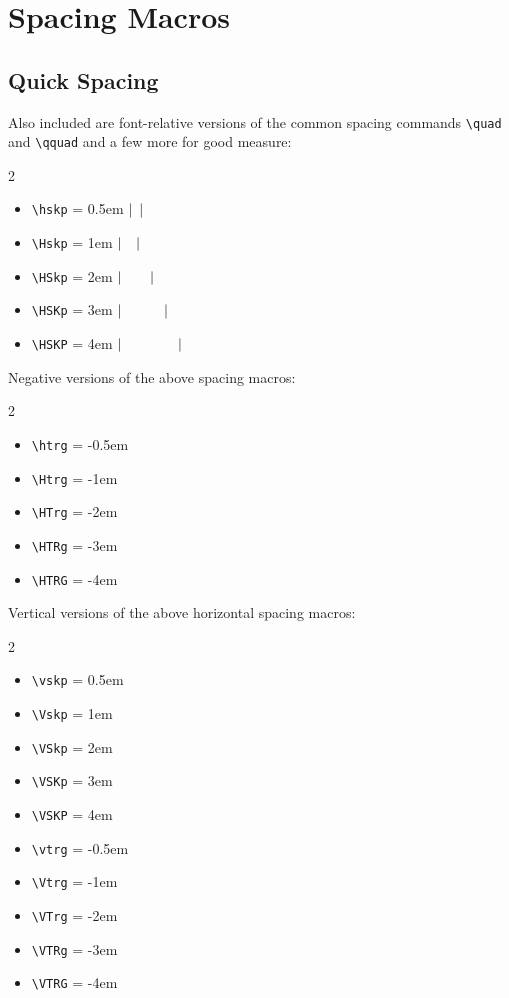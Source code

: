 \documentclass{article}
\begin{document}
\section{Spacing Macros}

\subsection*{Quick Spacing}

Also included are font-relative versions of the common spacing commands \verb|\quad| and \verb|\qquad| and a few more for good measure:
    \vtrg\begin{multicols}{2}
    \begin{itemize}
        \item\verb|\hskp|  = 0.5em \hspace{5pt}$\vert\hskip.5em\relax\vert$
        \item\verb|\Hskp|  = 1em   \hspace{13pt}$\vert\hskip1em\relax\vert$
        \item\verb|\HSkp|  = 2em   \hspace{13pt}$\vert\hskip2em\relax\vert$
        \item\verb|\HSKp|  = 3em   \hspace{5pt}$\vert\hskip3em\relax\vert$
        \item\verb|\HSKP|  = 4em   \hspace{5pt}$\vert\hskip4em\relax\vert$
    \end{itemize}
    \end{multicols}\Vtrg\vtrg
    
Negative versions of the above spacing macros:
	\vtrg\begin{multicols}{2}
	\begin{itemize}
		\item\verb|\htrg|  = -0.5em
		\item\verb|\Htrg|  = -1em
		\item\verb|\HTrg|  = -2em
		\item\verb|\HTRg|  = -3em
		\item\verb|\HTRG|  = -4em
	\end{itemize}
	\end{multicols}\Vtrg\vtrg
   
Vertical versions of the above horizontal spacing macros:
    \vtrg\begin{multicols}{2}
	\begin{itemize}
		\item\verb|\vskp| = 0.5em 
		\item\verb|\Vskp| = 1em 
		\item\verb|\VSkp| = 2em 
		\item\verb|\VSKp| = 3em 
		\item\verb|\VSKP| = 4em 
		
		\item\verb|\vtrg| = -0.5em 
		\item\verb|\Vtrg| = -1em 
		\item\verb|\VTrg| = -2em 
		\item\verb|\VTRg| = -3em 
		\item\verb|\VTRG| = -4em 
	\end{itemize}
	\end{multicols}\Vtrg\vtrg
\end{document}
